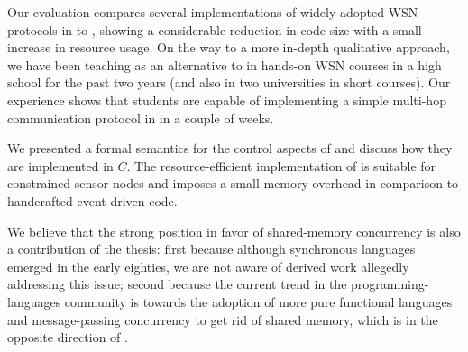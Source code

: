 Our evaluation compares several implementations of widely adopted WSN protocols 
in \CEU to \nesc, showing a considerable reduction in code size with a small 
increase in resource usage.
%
On the way to a more in-depth qualitative approach, we have been teaching \CEU 
as an alternative to \nesc in hands-on WSN courses in a high school for the 
past two years (and also in two universities in short courses).
Our experience shows that students are capable of implementing a simple 
multi-hop communication protocol in \CEU in a couple of weeks.

We presented a formal semantics for the control aspects of \CEU and discuss how 
they are implemented in $C$.
%
The resource-efficient implementation of \CEU is suitable for constrained 
sensor nodes and imposes a small memory overhead in comparison to handcrafted 
event-driven code.

We believe that the strong position in favor of shared-memory concurrency is 
also a contribution of the thesis:
%
first because although synchronous languages emerged in the early eighties, we 
are not aware of derived work allegedly addressing this issue;
%
second because the current trend in the programming-languages community is 
towards the adoption of more pure functional languages and message-passing 
concurrency to get rid of shared memory, which is in the opposite direction of 
\CEU.

